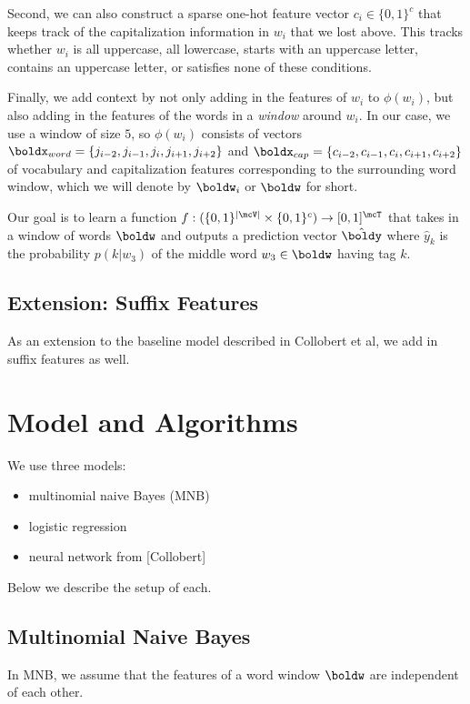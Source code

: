 \documentclass[11pt]{article}
\begin{document}
Second, we can also construct a sparse one-hot feature vector $c_i \in \{0,1\}^c$ that keeps track of the capitalization information in $w_i$ that we lost above. This tracks whether $w_i$ is all uppercase, all lowercase, starts with an uppercase letter, contains an uppercase letter, or satisfies none of these conditions. 

Finally, we add context by not only adding in the features of $w_i$ to $\phi(w_i)$, but also adding in the features of the words in a \emph{window} around $w_i$. In our case, we use a window of size $5$, so $\phi(w_i)$ consists of vectors $\boldx_{word} = \{j_{i-2}, j_{i-1},j_i, j_{i+1}, j_{i+2}\}$ and $\boldx_{cap} = \{c_{i-2}, c_{i-1}, c_i, c_{i+1}, c_{i+2}\}$ of vocabulary and capitalization features corresponding to the surrounding word window, which we will denote by $\boldw_i$ or $\boldw$ for short. 

Our goal is to learn a function $f: (\{0,1\}^{|\mcV|} \times \{0,1\}^c) \to [0,1]^\mcT$ that takes in a window of words $\boldw$ and outputs a prediction vector $\hat{\boldy}$ where $\hat{y}_k$ is the probability $p(k|w_3)$ of the middle word $w_3 \in \boldw$ having tag $k$.

\subsection{Extension: Suffix Features}

As an extension to the baseline model described in Collobert et al, we add in suffix features as well. %

\section{Model and Algorithms}

We use three models:
\begin{itemize}
  \item multinomial naive Bayes (MNB)
  \item logistic regression
  \item neural network from [Collobert]
\end{itemize}

Below we describe the setup of each.

\subsection{Multinomial Naive Bayes}

In MNB, we assume that the features of a word window $\boldw$ are independent of each other. 
\end{document}
